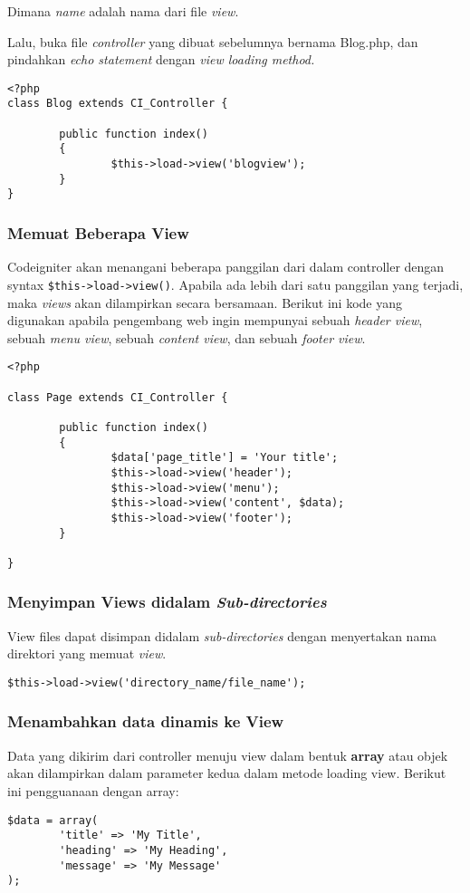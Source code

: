 \begin{enumerate}
Dimana \textit{name} adalah nama dari file \textit{view}.

Lalu, buka file \textit{controller} yang dibuat sebelumnya bernama Blog.php, dan pindahkan \textit{echo statement} dengan \textit{view loading method.}

\begin{lstlisting}[label=phpheg, frame=single] 
<?php
class Blog extends CI_Controller {

        public function index()
        {
                $this->load->view('blogview');
        }
}
\end{lstlisting}

\subsubsection{Memuat Beberapa View}
\label{sssec:view_2}
Codeigniter akan menangani beberapa panggilan dari dalam controller dengan syntax \verb|$this->load->view()|. Apabila ada lebih dari satu panggilan yang terjadi, maka \textit{views} akan dilampirkan secara bersamaan. Berikut ini kode yang digunakan apabila pengembang web ingin mempunyai sebuah \textit{header view}, sebuah \textit{menu view}, sebuah \textit{content view}, dan sebuah \textit{footer view}. \cite{codeigniter:17}
\begin{lstlisting}[label=phpheg, frame=single] 
<?php

class Page extends CI_Controller {

        public function index()
        {
                $data['page_title'] = 'Your title';
                $this->load->view('header');
                $this->load->view('menu');
                $this->load->view('content', $data);
                $this->load->view('footer');
        }

}
\end{lstlisting}

\subsubsection{Menyimpan Views didalam \textit{Sub-directories}}
\label{sssec:view_3}
View files dapat disimpan didalam \textit{sub-directories} dengan menyertakan nama direktori yang memuat \textit{view}.
\begin{lstlisting}[label=phpheg, frame=single] 
$this->load->view('directory_name/file_name');
\end{lstlisting}

\subsubsection{Menambahkan data dinamis ke View}
\label{sssec:view_4}
Data yang dikirim dari controller menuju view dalam bentuk \textbf{array} atau objek akan dilampirkan dalam parameter kedua dalam metode loading view. \cite{codeigniter:17}
Berikut ini pengguanaan dengan array:
\begin{lstlisting}[label=phpheg, frame=single] 
$data = array(
        'title' => 'My Title',
        'heading' => 'My Heading',
        'message' => 'My Message'
);


\end{lstlisting}
\end{enumerate}
